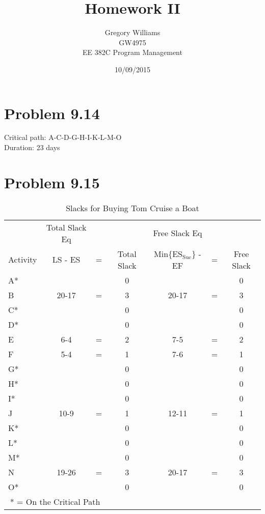 \documentclass{article}
\title{Homework II}
\author{Gregory Williams\\GW4975\\EE 382C Program Management}
\date{10/09/2015}
\begin{document}
	\maketitle
	\section*{Problem 9.14}
	
	\begin{center}
	\makebox[\textwidth]{
		}
	\end{center}
	Critical path: A-C-D-G-H-I-K-L-M-O \\
	Duration: 23 days
	\pagebreak
	\section*{Problem 9.15}
	
	{\renewcommand{\arraystretch}{1.2} 
	\begin{table}[h!tbp]
  		\begin{center}
    		\caption{Slacks for Buying Tom Cruise a Boat}
    		\label{tab:table1}
			
    		\begin{tabular}{lcccccc}
				 & Total Slack Eq &  &  & Free Slack Eq & &\\
				Activity & LS - ES & = & Total Slack & Min\{ES$_{\text{Suc}}$\} - EF &= & Free Slack \\
				\hline
      			A* & & &0 & & &0\\
      			B & 20-17&= & 3 & 20-17&= & 3\\
				C* &&& 0 &&& 0\\
				D* &&& 0 &&& 0\\
				E & 6-4&= & 2 & 7-5&= & 2\\
				F & 5-4&= & 1 & 7-6&= & 1\\
				G* &&& 0 &&& 0\\
				H* &&& 0 &&& 0\\
				I* &&& 0 &&& 0\\
				J & 10-9&= & 1 & 12-11&= & 1\\
				K* &&& 0 &&& 0\\
				L* &&& 0 &&& 0\\
				M* &&& 0 &&& 0\\
				N & 19-26&= & 3 & 20-17&= & 3\\
				O* &&& 0 &&& 0\\
				\hline
				\multicolumn{3}{c}{* = On the Critical Path}\\
    		\end{tabular}
  		\end{center}
	\end{table}
	}
	
\end{document}
